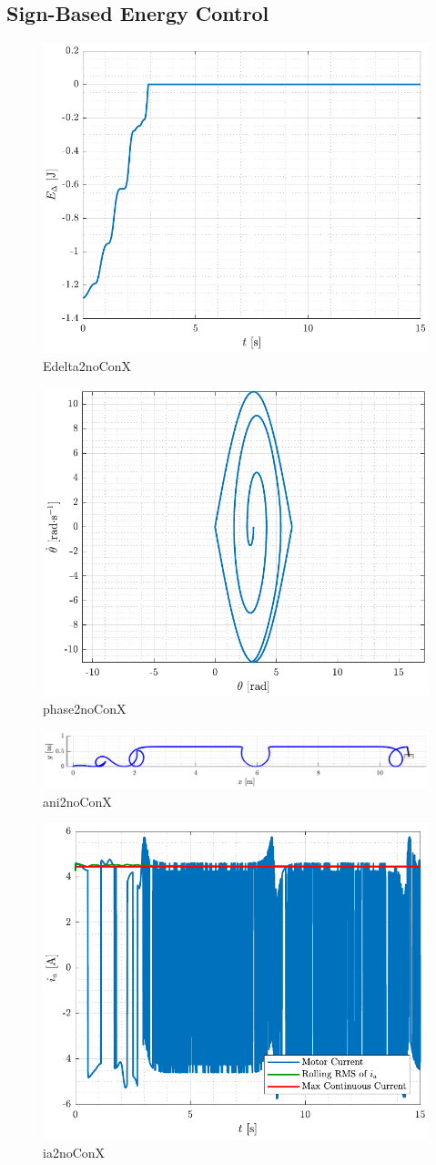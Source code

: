 \subsection{Sign-Based Energy Control}


\begin{figure}[H]
  \includegraphics[width=.5\textwidth]{figures/Edelta_2_noConX}
  \caption{Edelta2noConX}
  \label{fig:Edelta_2_noConX}
\end{figure}
%
\begin{figure}[H]
  \includegraphics[width=.5\textwidth]{figures/phase_2_noConX}
  \caption{phase2noConX}
  \label{fig:phase_2_noConX}
\end{figure}
%
\begin{figure}[H]
  \includegraphics[width=1\textwidth]{figures/ani_2_noConX}
  \caption{ani2noConX}
  \label{fig:ani_2_noConX}
\end{figure}
%
\begin{figure}[H]
  \includegraphics[width=.52\textwidth]{figures/ia_2_noConX}
  \caption{ia2noConX}
  \label{fig:ia_2_noConX}
\end{figure}


